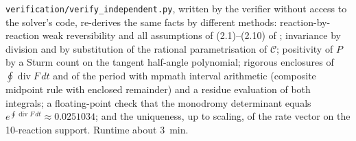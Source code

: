 \documentclass[11pt,a4paper]{report}
\begin{document}
\texttt{verification/verify\_independent.py}, written by the verifier without access to the solver's code,
re-derives the same facts by different methods: reaction-by-reaction weak reversibility and all assumptions of
(2.1)--(2.10) of \autocite{CraciunErban2025}; invariance by division and by substitution of the rational
parametrisation of \(\mathcal C\); positivity of \(P\) by a Sturm count on the tangent half-angle polynomial; rigorous
enclosures of \(\oint\operatorname{div}F\,dt\) and of the period with mpmath interval arithmetic (composite midpoint rule
with enclosed remainder) and a residue evaluation of both integrals; a floating-point check that the monodromy
determinant equals \(e^{\oint\operatorname{div}F\,dt}\approx0.0251034\); and the uniqueness, up to scaling, of the
rate vector on the 10-reaction support. Runtime about 3~min.

\paperreferences
\end{document}
